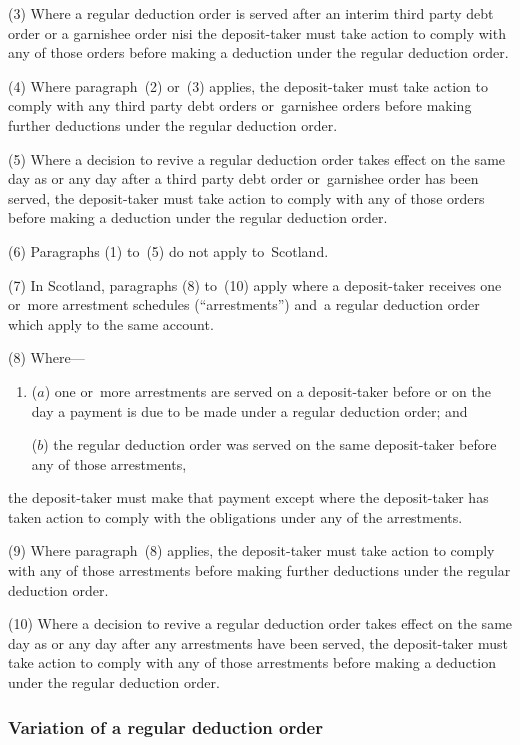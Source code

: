 \documentclass[12pt,a4paper]{article}
\begin{document}
(3) Where a regular deduction order is served after an interim third party debt order or a garnishee order nisi the deposit-taker must take action to comply with any of those orders before making a deduction under the regular deduction order.

(4) Where paragraph~(2) or~(3) applies, the deposit-taker must take action to comply with any third party debt orders or~garnishee orders before making further deductions under the regular deduction order.

(5) Where a decision to revive a regular deduction order takes effect on the same day as or any day after a third party debt order or~garnishee order has been served, the deposit-taker must take action to comply with any of those orders before making a deduction under the regular deduction order.

(6) Paragraphs (1) to~(5) do not apply to~Scotland.

(7) In Scotland, paragraphs (8) to~(10) apply where a deposit-taker receives one or~more arrestment schedules (“arrestments”) and~a regular deduction order which apply to the same account.

(8) Where—
\begin{enumerate}\item[]
($a$) one or~more arrestments are served on a deposit-taker before or on the day a payment is due to be made under a regular deduction order; and

($b$) the regular deduction order was served on the same deposit-taker before any of those arrestments,
\end{enumerate}
the deposit-taker must make that payment except where the deposit-taker has taken action to comply with the obligations under any of the arrestments.

(9) Where paragraph~(8) applies, the deposit-taker must take action to comply with any of those arrestments before making further deductions under the regular deduction order.

(10) Where a decision to revive a regular deduction order takes effect on the same day as or any day after any arrestments have been served, the deposit-taker must take action to comply with any of those arrestments before making a deduction under the regular deduction order.

\subsubsection[25I. Variation of a regular deduction order]{Variation of a regular deduction order}
\end{document}

